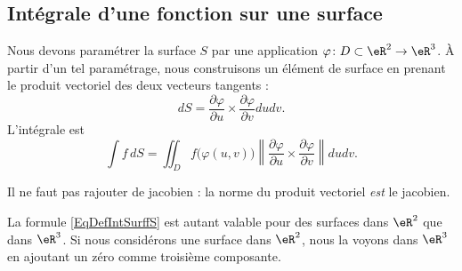 \subsection{Intégrale d'une fonction sur une surface}

Nous devons paramétrer la surface \( S\) par une application \( \varphi\colon D\subset\eR^2\to \eR^3\). À partir d'un tel paramétrage, nous construisons un élément de surface en prenant le produit vectoriel des deux vecteurs tangents :
\begin{equation}
	dS=\frac{ \partial \varphi }{ \partial u }\times\frac{ \partial \varphi }{ \partial v }dudv.
\end{equation}
L'intégrale est
\begin{equation}        \label{EqDefIntSurffS}
	\int f\,dS=\iint_Df\big( \varphi(u,v) \big)\left\| \frac{ \partial \varphi }{ \partial u }\times\frac{ \partial \varphi }{ \partial v } \right\|dudv.
\end{equation}

Il ne faut pas rajouter de jacobien : la norme du produit vectoriel \emph{est} le jacobien.

\begin{remark}
	La formule \eqref{EqDefIntSurffS} est autant valable pour des surfaces dans \( \eR^2\) que dans \( \eR^3\). Si nous considérons une surface dans \( \eR^2\), nous la voyons dans \( \eR^3\) en ajoutant un zéro comme troisième composante.
\end{remark}

